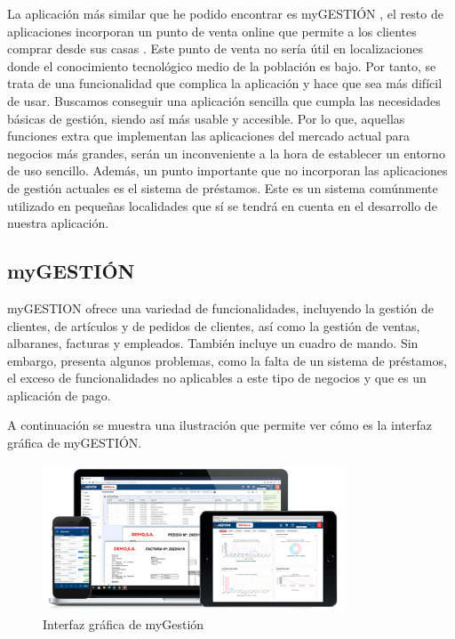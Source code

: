 La aplicación más similar que he podido encontrar es myGESTIÓN \cite{myGestion}, el resto de aplicaciones incorporan un punto de venta online que permite a los clientes comprar desde sus casas \cite{clover}. Este punto de venta no sería útil en localizaciones donde el conocimiento tecnológico medio de la población es bajo. Por tanto, se trata de una funcionalidad que complica la aplicación y hace que sea más difícil de usar. Buscamos conseguir una aplicación sencilla que cumpla las necesidades básicas de gestión, siendo así más usable y accesible. Por lo que, aquellas funciones extra que implementan las aplicaciones del mercado actual para negocios más grandes, serán un inconveniente a la hora de establecer un entorno de uso sencillo. Además, un punto importante que no incorporan las aplicaciones de gestión actuales es el sistema de préstamos. Este es un sistema comúnmente utilizado en pequeñas localidades que sí se tendrá en cuenta en el desarrollo de nuestra aplicación. 

\subsection{myGESTIÓN}

myGESTION ofrece una variedad de funcionalidades, incluyendo la gestión de clientes, de artículos y de pedidos de clientes, así como la gestión de ventas, albaranes, facturas y empleados. También incluye un cuadro de mando. Sin embargo, presenta algunos problemas, como la falta de un sistema de préstamos, el exceso de funcionalidades no aplicables a este tipo de negocios y que es un aplicación de pago. 

A continuación se muestra una ilustración que permite ver cómo es la interfaz gráfica de myGESTIÓN. 


\begin{figure}[H]
	\centering
	\includegraphics[width=0.8\textwidth]{imagenes/aplicacionesSimilares/caracteristicas-mygestion.png}
	\caption{Interfaz gráfica de myGestión}
\end{figure}

